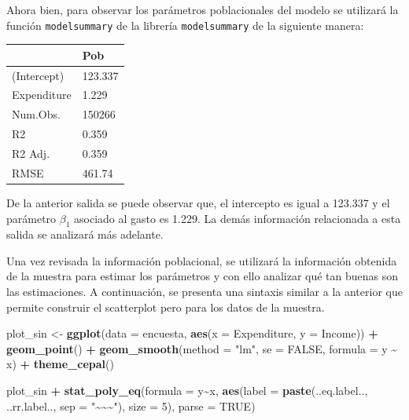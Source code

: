 \documentclass[
  12pt,
]{book}
\newenvironment{Shaded}{\begin{snugshade}}{\end{snugshade}}
\newcommand{\AttributeTok}[1]{\textcolor[rgb]{0.13,0.29,0.53}{#1}}
\newcommand{\ConstantTok}[1]{\textcolor[rgb]{0.56,0.35,0.01}{#1}}
\newcommand{\DecValTok}[1]{\textcolor[rgb]{0.00,0.00,0.81}{#1}}
\newcommand{\FunctionTok}[1]{\textcolor[rgb]{0.13,0.29,0.53}{\textbf{#1}}}
\newcommand{\NormalTok}[1]{#1}
\newcommand{\OtherTok}[1]{\textcolor[rgb]{0.56,0.35,0.01}{#1}}
\newcommand{\SpecialCharTok}[1]{\textcolor[rgb]{0.81,0.36,0.00}{\textbf{#1}}}
\newcommand{\StringTok}[1]{\textcolor[rgb]{0.31,0.60,0.02}{#1}}
\begin{document}
Ahora bien, para observar los parámetros poblacionales del modelo se utilizará la función \texttt{modelsummary} de la librería \texttt{modelsummary} de la siguiente manera:

\begin{tabular}{ll}
\hline
& Pob \\ \hline
(Intercept) & \num{123.337} \\
Expenditure & \num{1.229} \\
Num.Obs. & \num{150266} \\
R2 & \num{0.359} \\
R2 Adj. & \num{0.359} \\
RMSE & \num{461.74} \\
\hline
\end{tabular}

De la anterior salida se puede observar que, el intercepto es igual a 123.337 y el parámetro \(\beta_{1}\) asociado al gasto es 1.229. La demás información relacionada a esta salida se analizará más adelante.

Una vez revisada la información poblacional, se utilizará la información obtenida de la muestra para estimar los parámetros y con ello analizar qué tan buenas son las estimaciones. A continuación, se presenta una sintaxis similar a la anterior que permite construir el scatterplot pero para los datos de la muestra.

\begin{Shaded}
\begin{Highlighting}[]
\NormalTok{plot\_sin }\OtherTok{\textless{}{-}} \FunctionTok{ggplot}\NormalTok{(}\AttributeTok{data =}\NormalTok{ encuesta,}
            \FunctionTok{aes}\NormalTok{(}\AttributeTok{x =}\NormalTok{ Expenditure, }\AttributeTok{y =}\NormalTok{ Income)) }\SpecialCharTok{+}
            \FunctionTok{geom\_point}\NormalTok{() }\SpecialCharTok{+}
            \FunctionTok{geom\_smooth}\NormalTok{(}\AttributeTok{method =} \StringTok{"lm"}\NormalTok{,}
            \AttributeTok{se =} \ConstantTok{FALSE}\NormalTok{, }\AttributeTok{formula =}\NormalTok{ y }\SpecialCharTok{\textasciitilde{}}\NormalTok{ x) }\SpecialCharTok{+} \FunctionTok{theme\_cepal}\NormalTok{()}

\NormalTok{plot\_sin }\SpecialCharTok{+} \FunctionTok{stat\_poly\_eq}\NormalTok{(}\AttributeTok{formula =}\NormalTok{ y}\SpecialCharTok{\textasciitilde{}}\NormalTok{x, }\FunctionTok{aes}\NormalTok{(}\AttributeTok{label =} \FunctionTok{paste}\NormalTok{(..eq.label..,}
\NormalTok{     ..rr.label.., }\AttributeTok{sep =} \StringTok{"\textasciitilde{}\textasciitilde{}\textasciitilde{}"}\NormalTok{), }\AttributeTok{size =} \DecValTok{5}\NormalTok{), }\AttributeTok{parse =} \ConstantTok{TRUE}\NormalTok{)}
\end{Highlighting}
\end{Shaded}
\end{document}
